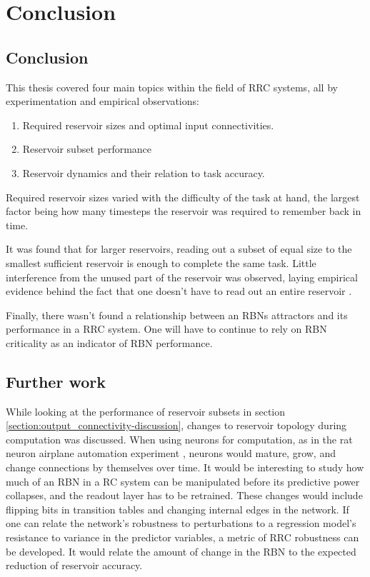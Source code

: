 \chapter{Conclusion}
\label{chapter:conclusion}

\section{Conclusion}

This thesis covered four main topics within the field of RRC systems,
all by experimentation and empirical observations:

\begin{enumerate}
    \item Required reservoir sizes and optimal input connectivities.
    \item Reservoir subset performance
    \item Reservoir dynamics and their relation to task accuracy.
\end{enumerate}

Required reservoir sizes varied with the difficulty of the task at hand,
the largest factor being how many timesteps the reservoir was required to remember back in time.

It was found that for larger reservoirs, reading out a subset of equal size to the smallest sufficient reservoir is enough to complete the same task.
Little interference from the unused part of the reservoir was observed,
laying empirical evidence behind the fact that one doesn't have to read out an entire reservoir .

Finally, there wasn't found a relationship between an RBNs attractors and its performance in a RRC system.
One will have to continue to rely on RBN criticality as an indicator of RBN performance.


\section{Further work}

While looking at the performance of reservoir subsets in section \ref{section:output_connectivity-discussion},
changes to reservoir topology during computation was discussed.
When using neurons for computation,
as in the rat neuron airplane automation experiment \cite{demarse2005adaptive},
neurons would mature, grow, and change connections by themselves over time.
It would be interesting to study how much of an RBN in a RC system can be manipulated before its predictive power collapses,
and the readout layer has to be retrained.
These changes would include flipping bits in transition tables and changing internal edges in the network.
If one can relate the network's robustness to perturbations to a regression model's resistance to variance in the predictor variables,
a metric of RRC robustness can be developed.
It would relate the amount of change in the RBN to the expected reduction of reservoir accuracy.


